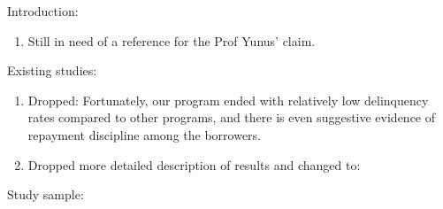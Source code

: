 Introduction:
\begin{enumerate}
\vspace{1.0ex}\setlength{\itemsep}{1.0ex}\setlength{\baselineskip}{12pt}
\item	Still in need of a reference for the Prof Yunus' claim.
\end{enumerate}
Existing studies:
\begin{enumerate}
\vspace{1.0ex}\setlength{\itemsep}{1.0ex}\setlength{\baselineskip}{12pt}
\item	Dropped: Fortunately, our program ended with relatively low delinquency rates compared to other programs, and there is even suggestive evidence of repayment discipline among the borrowers. 
\item	Dropped more detailed description of results and changed to: 
\end{enumerate}
Study sample:
